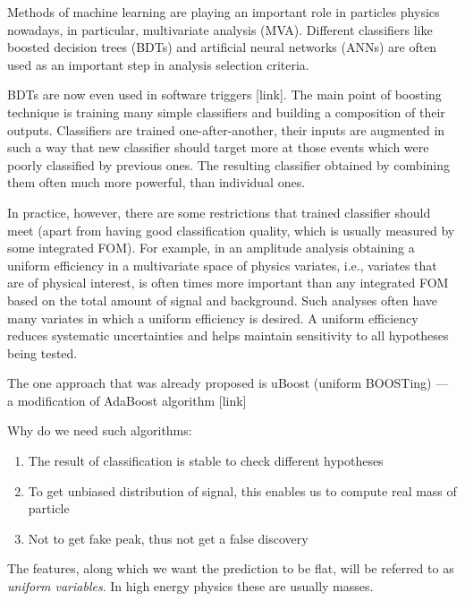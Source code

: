 Methods of machine learning are playing an important role in particles physics nowadays, in particular, multivariate analysis (MVA). 
Different classifiers like boosted decision trees (BDTs) and artificial neural networks (ANNs) are often used as an important step in analysis selection criteria. 

BDTs are now even used in software triggers [link]. The main point of boosting technique is training many simple classifiers and building a composition of their outputs.
Classifiers are trained one-after-another, their inputs are augmented in such a way that new classifier should target more at those events which were poorly classified by previous ones. The resulting classifier obtained by combining them often much more powerful, than individual ones.


In practice, however, there are some restrictions that trained classifier should meet (apart from having good classification quality, which is usually measured by some integrated FOM). For example, in an amplitude analysis obtaining a uniform efficiency in a multivariate space of physics variates, i.e., variates that are of physical interest, is often times more important than any integrated FOM based on the total amount of signal and background. Such analyses often have many variates in which a uniform efficiency is desired. A uniform efficiency reduces systematic uncertainties and helps maintain sensitivity to all hypotheses being tested.

The one approach that was already proposed is uBoost (uniform BOOSTing) --- a modification of AdaBoost algorithm [link]

Why do we need such algorithms:

\begin{enumerate}
	\item The result of classification is stable to check different hypotheses
	\item To get unbiased distribution of signal, this enables us to compute real mass of particle
	\item Not to get fake peak, thus not get a false discovery
\end{enumerate}

The features, along which we want the prediction to be flat, will be referred to as 
\textit{uniform variables}. In high energy physics these are usually masses.

